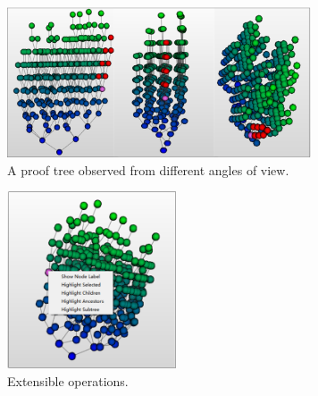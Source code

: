 \documentclass[runningheads]{llncs}
\newcommand\tool[1]{\textsf{#1}}
\newcommand\vmdv{\tool{VMDV}}
\newcommand\couic[1]{}
\begin{document}
\begin{figure}[h]
\centering
\includegraphics[width=9cm]{./phi_prooftreegraph_angles.png}
\caption{A proof tree observed from different angles of view.}
\label{fig:prooftree_angles}
\end{figure}
 
 

\begin{figure}[h!]
\centering
\includegraphics[width=5cm]{./user_defined_operation.png}
\caption{Extensible operations.}
\label{fig:user_defined_operation}
\end{figure}
\smallskip

\couic{
\hspace{-0.48cm}
{\bf Highlighting.}
Sometimes some local information (for instance, specific nodes, edges, or proof patterns) is more interesting rather than the overall structure. Highlighting becomes a useful operation to show the local focused parts of the given proof tree. \vmdv{} enables highlighting parts of the proof tree either by manual selection using mouse clicking, or by automatic selection via formulae searching. (Fig. \ref{fig:high_different})\footnote{In \vmdv{}, we say that the proofs of two formulas have similar pattern if the first rules applied in the two bottom-up proofs are the same. For instance, if the proofs of two formulas in \textsf{SCTL} have similar pattern, then according to the rules in Fig. \ref{fig:sctl_rules}, both formulas must have the same modality or connector, or both are atomic formulas with the same predicate.}
\smallskip
}
\end{document}
